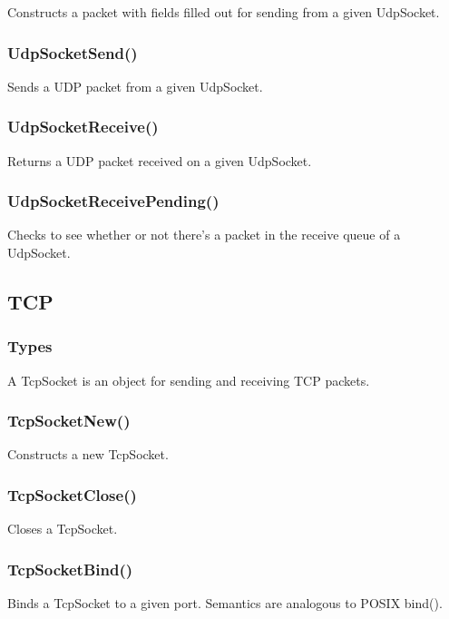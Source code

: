 \documentclass{article}
\begin{document}
Constructs a packet with fields filled out for sending from a given
UdpSocket.

\subsubsection{UdpSocketSend()}

Sends a UDP packet from a given UdpSocket.

\subsubsection{UdpSocketReceive()}

Returns a UDP packet received on a given UdpSocket.

\subsubsection{UdpSocketReceivePending()}

Checks to see whether or not there's a packet in the receive queue of
a UdpSocket.

\subsection{TCP}

\subsubsection{Types}

A TcpSocket is an object for sending and receiving TCP packets.

\subsubsection{TcpSocketNew()}

Constructs a new TcpSocket.

\subsubsection{TcpSocketClose()}

Closes a TcpSocket.

\subsubsection{TcpSocketBind()}

Binds a TcpSocket to a given port.  Semantics are analogous to POSIX
bind().
\end{document}
